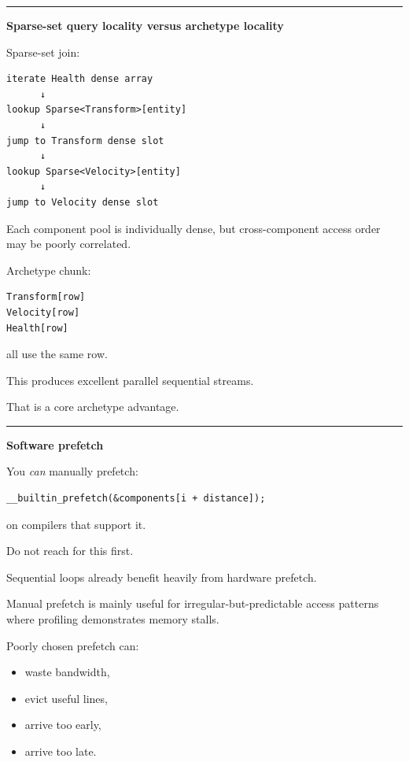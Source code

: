 \begin{center}\rule{0.5\linewidth}{0.5pt}\end{center}

\textbf{Sparse-set query locality versus archetype locality}

Sparse-set join:

\begin{verbatim}
iterate Health dense array
      ↓
lookup Sparse<Transform>[entity]
      ↓
jump to Transform dense slot
      ↓
lookup Sparse<Velocity>[entity]
      ↓
jump to Velocity dense slot
\end{verbatim}

Each component pool is individually dense, but cross-component access order may be poorly correlated.

Archetype chunk:

\begin{verbatim}
Transform[row]
Velocity[row]
Health[row]
\end{verbatim}

all use the same row.

This produces excellent parallel sequential streams.

That is a core archetype advantage.

\begin{center}\rule{0.5\linewidth}{0.5pt}\end{center}

\textbf{Software prefetch}

You \emph{can} manually prefetch:

\begin{verbatim}
__builtin_prefetch(&components[i + distance]);
\end{verbatim}

on compilers that support it.

Do not reach for this first.

Sequential loops already benefit heavily from hardware prefetch.

Manual prefetch is mainly useful for irregular-but-predictable access patterns where profiling demonstrates memory stalls.

Poorly chosen prefetch can:

\begin{itemize}
\tightlist
\item
  waste bandwidth,
\item
  evict useful lines,
\item
  arrive too early,
\item
  arrive too late.
\end{itemize}

